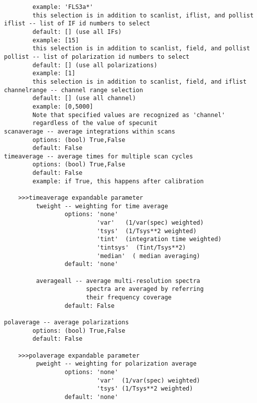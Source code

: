 \begin{verbatim}
        example: 'FLS3a*'
        this selection is in addition to scanlist, iflist, and pollist
iflist -- list of IF id numbers to select
        default: [] (use all IFs)
        example: [15]
        this selection is in addition to scanlist, field, and pollist
pollist -- list of polarization id numbers to select
        default: [] (use all polarizations)
        example: [1]
        this selection is in addition to scanlist, field, and iflist
channelrange -- channel range selection
        default: [] (use all channel)
        example: [0,5000]
        Note that specified values are recognized as 'channel'
        regardless of the value of specunit 
scanaverage -- average integrations within scans
        options: (bool) True,False
        default: False
timeaverage -- average times for multiple scan cycles
        options: (bool) True,False
        default: False
        example: if True, this happens after calibration

    >>>timeaverage expandable parameter
         tweight -- weighting for time average
                 options: 'none' 
                          'var'   (1/var(spec) weighted)
                          'tsys'  (1/Tsys**2 weighted)
                          'tint'  (integration time weighted)
                          'tintsys'  (Tint/Tsys**2)
                          'median'  ( median averaging)
                 default: 'none'

         averageall -- average multi-resolution spectra
                       spectra are averaged by referring 
                       their frequency coverage
                 default: False

polaverage -- average polarizations
        options: (bool) True,False
        default: False

    >>>polaverage expandable parameter
         pweight -- weighting for polarization average
                 options: 'none'
                          'var'  (1/var(spec) weighted)
                          'tsys' (1/Tsys**2 weighted)
                 default: 'none'


\end{verbatim}
